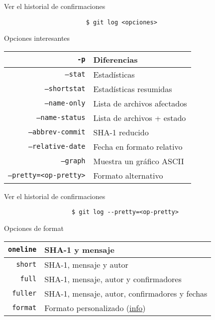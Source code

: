 \begin{frame}[fragile]{Ver el historial de confirmaciones}
  \begin{center}
  \begin{verbatim}
                       $ git log <opciones>
  \end{verbatim}
  \alert{Opciones interesantes}
  \end{center}
  \begin{table}
  \begin{tabular}{|r|l|} \hline
    \texttt{-p} & Diferencias \\ \hline
    \texttt{--stat} & Estadísticas \\ \hline
    \texttt{--shortstat} & Estadísticas resumidas \\ \hline
    \texttt{--name-only} & Lista de archivos afectados \\ \hline
    \texttt{--name-status} & Lista de archivos + estado \\ \hline
    \texttt{--abbrev-commit} & SHA-1 reducido \\ \hline
    \texttt{--relative-date} & Fecha en formato relativo \\ \hline
    \texttt{--graph} & Muestra un gráfico ASCII \\ \hline
    \texttt{--pretty=<op-pretty>} & Formato alternativo \\ \hline
  \end{tabular}
  \end{table}
\end{frame}

\begin{frame}[fragile]{Ver el historial de confirmaciones}
  \begin{center}
  \begin{verbatim}
                   $ git log --pretty=<op-pretty>
  \end{verbatim}
  \alert{Opciones de format}
  \end{center}
  \begin{table}
  \begin{tabular}{|r|l|} \hline
    \texttt{oneline} & SHA-1 y mensaje \\ \hline
    \texttt{short} & SHA-1, mensaje y autor \\ \hline
    \texttt{full} & SHA-1, mensaje, autor y confirmadores \\ \hline
    \texttt{fuller} & SHA-1, mensaje, autor, confirmadores y fechas \\ \hline
    \texttt{format} & Formato personalizado (\href{https://git-scm.com/docs/pretty-formats}{info}) \\ \hline
  \end{tabular}
  \end{table}
\end{frame}

